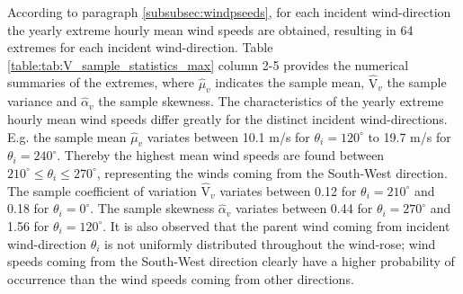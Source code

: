 According to paragraph \ref{subsubsec:windpseeds}, for each incident wind-direction the yearly extreme hourly mean wind speeds are obtained, resulting in 64 extremes for each incident wind-direction. Table \ref{table:tab:V_sample_statistics_max}                                                            column 2-5  provides the numerical summaries of the extremes, where $\hat{\mu}_v$ indicates the sample mean, $\hat{\text{V}}_v$ the sample variance and $\hat{\alpha}_v$  the sample skewness. The characteristics of the yearly extreme hourly mean wind speeds differ greatly for the distinct incident wind-directions. E.g. the sample mean $\hat{\mu}_v$ variates between 10.1 m/s for $\theta_i=120^{\circ}$ to 19.7 m/s for $\theta_i=240^{\circ}$. Thereby the highest mean wind speeds are found between $210^{\circ}\leq \theta_i\leq 270^{\circ}$, representing the winds coming from the South-West direction. The sample coefficient of variation $\hat{\text{V}}_v$ variates between 0.12   for $\theta_i=210^{\circ}$ and 0.18 for $\theta_i=0^{\circ}$. The sample skewness $\hat{\alpha}_v$ variates between 0.44  for $\theta_i=270^{\circ}$ and 1.56 for $\theta_i=120^{\circ}$. It is also observed that the parent wind coming from incident wind-direction $\theta_i$ is not uniformly distributed throughout the wind-rose; wind speeds coming from the South-West direction clearly have a higher probability of occurrence than the wind speeds coming from other directions. 


